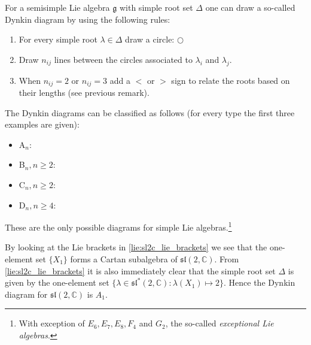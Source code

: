         \begin{construct}\label{lie:construct_dynkin}
        	For a semisimple Lie algebra $\mathfrak{g}$ with simple root set $\Delta$ one can draw a so-called Dynkin diagram by using the following rules:
        	\begin{enumerate}
        		\item For every simple root $\lambda\in\Delta$ draw a circle: $\bigcirc$
        		\item Draw $n_{ij}$ lines between the circles associated to $\lambda_i$ and $\lambda_j$.
        		\item When $n_{ij} = 2$ or $n_{ij} = 3$ add a $<$ or $>$ sign to relate the roots based on their lengths (see previous remark).
        	\end{enumerate}
        \end{construct}
        
        \begin{property}
        	The Dynkin diagrams can be classified as follows (for every type the first three examples are given):
        	\begin{itemize}
        		\item A$_n$: \begin{center}\dynk {}  \end{center}
			\item B$_n, n\geq2$: \begin{center}   \end{center}
			\item C$_n, n\geq2$: \begin{center}   \end{center}
			\item D$_n, n\geq4$: \begin{center}   \end{center}
        	\end{itemize}
        	These are the only possible diagrams for simple Lie algebras.\footnote{With exception of $E_6, E_7, E_8, F_4$ and $G_2$, the so-called \textit{exceptional Lie algebras}.}
        \end{property}
        
        \begin{example}
        	By looking at the Lie brackets in \ref{lie:sl2c_lie_brackets} we see that the one-element set $\{X_1\}$ forms a Cartan subalgebra of $\mathfrak{sl}(2, \mathbb{C})$. From \ref{lie:sl2c_lie_brackets} it is also immediately clear that the simple root set $\Delta$ is given by the one-element set $\{\lambda\in\mathfrak{sl}^*(2, \mathbb{C}): \lambda(X_1)\mapsto 2\}$. Hence the Dynkin diagram for $\mathfrak{sl}(2, \mathbb{C})$ is $A_1$.
        \end{example}
        
